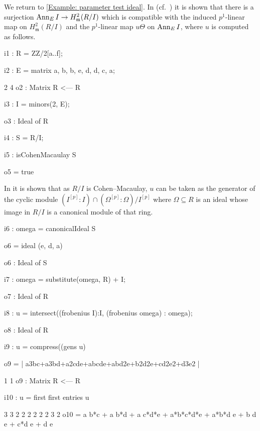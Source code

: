 \documentclass{amsart}
\begin{document}
\begin{example}
We return to \autoref{Example: parameter test ideal}.
In (cf.~\cite[\S 9]{KatzmanParameterTestIdealOfCMRings}) it is shown that
there is a surjection $\operatorname{{Ann}}_E I \rightarrow H^2_{\mathfrak{m}} (R/I)$
which is compatible  with the induced $p^1$-linear map on $H^2_{\mathfrak{m}} (R/I)$
and the $p^1$-linear map $u \Theta$ on $\operatorname{{Ann}}_E I$, where $u$ is computed as follows.

\medskip
{\small
{}
\begin{MyVerbatim}
i1 : R = ZZ/2[a..f];

i2 : E = matrix {{a, b, b, e}, {d, d, c, a}};

             2       4
o2 : Matrix R  <--- R

i3 : I = minors(2, E);

o3 : Ideal of R

i4 : S = R/I;

i5 : isCohenMacaulay S

o5 = true
\end{MyVerbatim}
}\medskip

In \cite{KatzmanParameterTestIdealOfCMRings} it is shown that as $R/I$ is Cohen--Macaulay, $u$
can be taken as the generator of the cyclic module $(I^{[p]}:I) \cap (\Omega^{[p]}:\Omega)/I^{[p]}$
where $\Omega \subseteq R$ is an ideal whose image in $R/I$ is a canonical module of that ring.


\medskip
{\small
{}
\begin{MyVerbatim}
i6 : omega = canonicalIdeal S

o6 = ideal (e, d, a)

o6 : Ideal of S

i7 : omega = substitute(omega, R) + I;

o7 : Ideal of R

i8 : u = intersect((frobenius I):I, (frobenius omega) : omega);

o8 : Ideal of R

i9 : u = compress((gens u) %

o9 = | a3bc+a3bd+a2cde+abcde+abd2e+b2d2e+cd2e2+d3e2 |

             1       1
o9 : Matrix R  <--- R

i10 :  u = first first entries u

       3       3       2                         2     2 2       2 2    3 2
o10 = a b*c + a b*d + a c*d*e + a*b*c*d*e + a*b*d e + b d e + c*d e  + d e


\end{MyVerbatim}}
\end{example}
\end{document}
